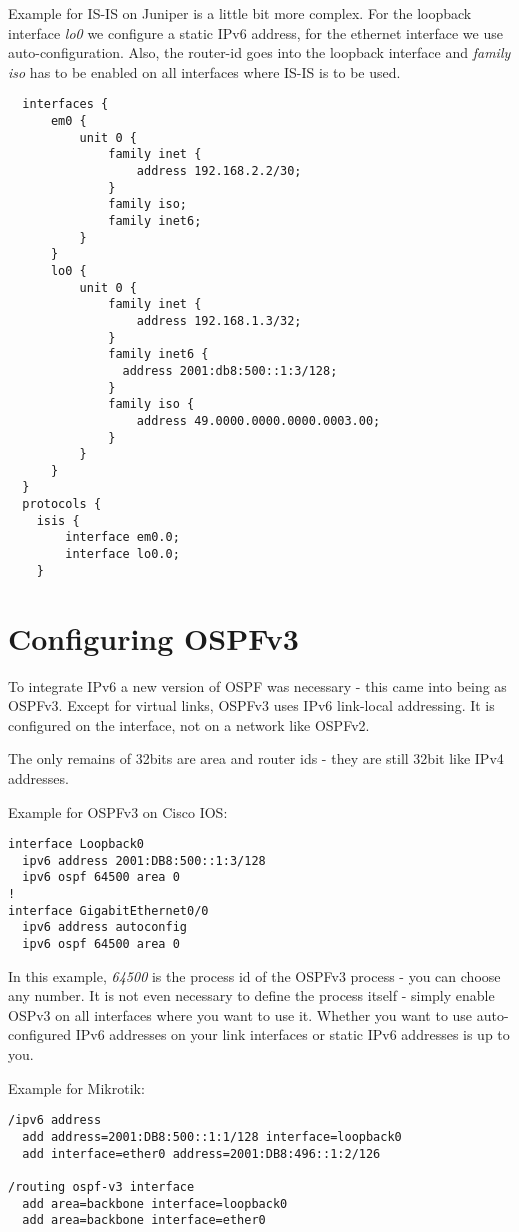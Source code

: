 Example for IS-IS on Juniper is a little bit more complex. For the loopback interface \emph{lo0} we configure a static IPv6 address, for the ethernet interface we use auto-configuration. Also, the router-id goes into the loopback interface and \emph{family iso} has to be enabled on all interfaces where IS-IS is to be used.
\begin{verbatim}
  interfaces {
      em0 {
          unit 0 {
              family inet {
                  address 192.168.2.2/30;
              }
              family iso;
              family inet6;
          }
      }
      lo0 {
          unit 0 {
              family inet {
                  address 192.168.1.3/32;
              }
              family inet6 {
                address 2001:db8:500::1:3/128;
              }
              family iso {
                  address 49.0000.0000.0000.0003.00;
              }
          }
      }
  }
  protocols {
    isis {
        interface em0.0;
        interface lo0.0;
    }
\end{verbatim}


\section{Configuring OSPFv3}
To integrate IPv6 a new version of OSPF was necessary - this came into being as OSPFv3. Except for virtual links, OSPFv3 uses IPv6 link-local addressing. It is configured on the interface, not on a network like OSPFv2.

The only remains of 32bits are area and router ids - they are still 32bit like IPv4 addresses.

Example for OSPFv3 on Cisco IOS:
\begin{verbatim}
interface Loopback0
  ipv6 address 2001:DB8:500::1:3/128
  ipv6 ospf 64500 area 0
!
interface GigabitEthernet0/0
  ipv6 address autoconfig
  ipv6 ospf 64500 area 0
\end{verbatim}
In this example, \emph{64500} is the process id of the OSPFv3 process - you can choose any number. It is not even necessary to define the process itself - simply enable OSPv3 on all interfaces where you want to use it. Whether you want to use auto-configured IPv6 addresses on your link interfaces or static IPv6 addresses is up to you.

Example for Mikrotik:
\begin{verbatim}
/ipv6 address
  add address=2001:DB8:500::1:1/128 interface=loopback0
  add interface=ether0 address=2001:DB8:496::1:2/126

/routing ospf-v3 interface
  add area=backbone interface=loopback0
  add area=backbone interface=ether0
\end{verbatim}

